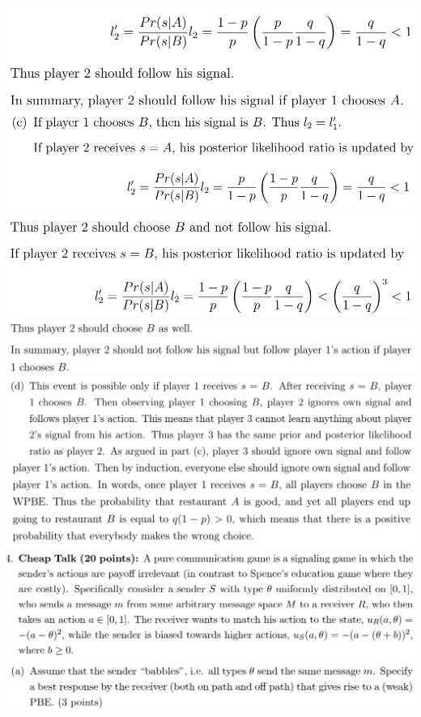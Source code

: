 \documentclass[8pt,landscape]{extarticle}
\begin{document}
\begin{multicols*}{3}
    \includegraphics[width=0.62\linewidth,keepaspectratio]{Screenshots/Screenshot 2024-03-11 195543.png}
    \includegraphics[width=0.67\linewidth,keepaspectratio]{Screenshots/Screenshot 2024-03-11 195548.png}
    \includegraphics[width=0.64\linewidth,keepaspectratio]{Screenshots/Screenshot 2024-03-11 195551.png}
    \includegraphics[width=0.78\linewidth,keepaspectratio]{Screenshots/Screenshot 2024-03-11 195556.png}
    \includegraphics[width=0.82\linewidth,keepaspectratio]{Screenshots/Screenshot 2024-03-11 195605.png}
    \includegraphics[width=0.79\linewidth,keepaspectratio]{Screenshots/Screenshot 2024-03-11 195610.png}
    \includegraphics[width=0.76\linewidth,keepaspectratio]{Screenshots/Screenshot 2024-03-11 195619.png}
    \includegraphics[width=0.74\linewidth,keepaspectratio]{Screenshots/Screenshot 2024-03-11 195622.png}

\end{multicols*}
\end{document}
